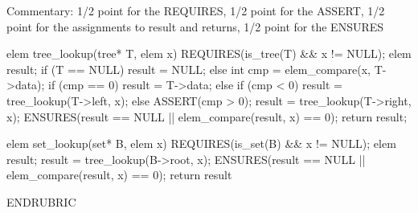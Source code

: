 Commentary:
1/2 point for the REQUIRES, 1/2 point for the ASSERT, 1/2 point for the assignments to result and returns, 1/2 point for the ENSURES

elem tree_lookup(tree* T, elem x) {
  REQUIRES(is_tree(T) && x != NULL);
  elem result;
  if (T == NULL) {
    result = NULL;
  } else {
    int cmp = elem_compare(x, T->data);
    if (cmp == 0) {
      result = T->data;
    } else if (cmp < 0) {
      result = tree_lookup(T->left, x);
    } else {
      ASSERT(cmp > 0);
      result = tree_lookup(T->right, x);
    }
  }
  ENSURES(result == NULL || elem_compare(result, x) == 0);
  return result;
}

elem set_lookup(set* B, elem x) {
  REQUIRES(is_set(B) && x != NULL);
  elem result;
  result = tree_lookup(B->root, x);
  ENSURES(result == NULL || elem_compare(result, x) == 0);
  return result
}

ENDRUBRIC
